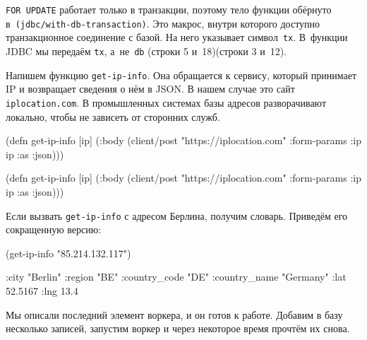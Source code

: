\fi

\verb|FOR UPDATE| работает только в транзакции, поэтому тело функции обёрнуто
в~\texttt{(jdbc/with\--db-transaction)}. Это макрос, внутри которого доступно
транзакционное соединение с базой. На него указывает символ~\verb|tx|. В~функции
JDBC мы передаём \verb|tx|, а~не~\verb|db| \ifnarrow(строки 5 и~18)\else(строки 3 и~12)\fi.


Напишем функцию \verb|get-ip-info|. Она обращается к сервису, который принимает
IP и возвращает сведения о нём в JSON. В нашем случае это сайт
\verb|iplocation.com|. В промышленных системах базы адресов разворачивают
локально, чтобы не зависеть от сторонних служб.

\ifnarrow

\begin{english}
  \begin{clojure}
(defn get-ip-info [ip]
  (:body (client/post
           "https://iplocation.com"
           {:form-params {:ip ip}
            :as :json})))
  \end{clojure}
\end{english}

\else

\begin{english}
  \begin{clojure}
(defn get-ip-info [ip]
  (:body (client/post "https://iplocation.com"
                      {:form-params {:ip ip}
                       :as :json})))
  \end{clojure}
\end{english}

\fi

\noindent
Если вызвать \verb|get-ip-info| с адресом Берлина, получим словарь. Приведём его
сокращенную версию:

\begin{english}
  \begin{clojure}
(get-ip-info "85.214.132.117")

{:city "Berlin"
 :region "BE"
 :country_code "DE"
 :country_name "Germany"
 :lat 52.5167
 :lng 13.4}
  \end{clojure}
\end{english}

Мы описали последний элемент воркера, и он готов к работе. Добавим в базу
несколько записей, запустим воркер и через некоторое время прочтём их снова.

\ifnarrow

